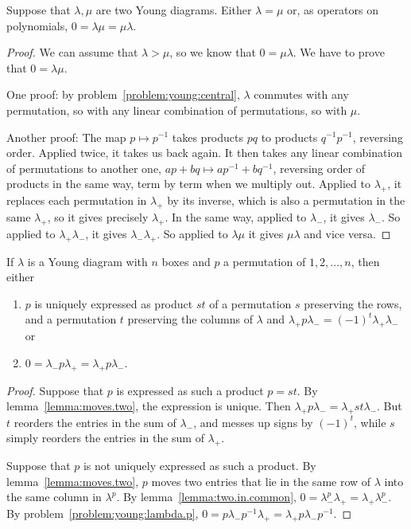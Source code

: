 \begin{theorem}
Suppose that \(\lambda, \mu\) are two Young diagrams.
Either \(\lambda=\mu\) or, as operators on polynomials, \(0=\lambda\mu=\mu\lambda\).
\end{theorem}
\begin{proof}
We can assume that \(\lambda > \mu\), so we know that \(0=\mu\lambda\).
We have to prove that \(0=\lambda\mu\).

One proof: by problem~\vref{problem:young:central}, \(\lambda\) commutes with any permutation, so with any linear combination of permutations, so with \(\mu\).

Another proof:
The map \(p \mapsto p^{-1}\) takes products \(pq\) to products \(q^{-1}p^{-1}\), reversing order.
Applied twice, it takes us back again.
It then takes any linear combination of permutations to another one, \(ap+bq\mapsto ap^{-1}+bq^{-1}\), reversing order of products in the same way, term by term when we multiply out.
Applied to \(\lambda_+\), it replaces each permutation in \(\lambda_+\) by its inverse, which is also a permutation in the same \(\lambda_+\), so it gives precisely \(\lambda_+\).
In the same way, applied to \(\lambda_-\), it gives \(\lambda_-\).
So applied to \(\lambda_+\lambda_-\), it gives \(\lambda_-\lambda_+\).
So applied to \(\lambda\mu\) it gives \(\mu\lambda\) and vice versa.
\end{proof}




\begin{corollary}\label{corollary:young.insertion}
If \(\lambda\) is a Young diagram with \(n\) boxes and \(p\) a permutation of \(1,2,\dots,n\), then either
\begin{enumerate}
\item
\(p\) is uniquely expressed as product \(st\) of a permutation \(s\) preserving the rows, and a permutation \(t\) preserving the columns of \(\lambda\) and \(\lambda_+p\lambda_-=(-1)^t\lambda_+\lambda_-\) or
\item 
\(0=\lambda_-p\lambda_+=\lambda_+p\lambda_-\).
\end{enumerate}
\end{corollary}
\begin{proof}
Suppose that \(p\) is expressed as such a product \(p=st\).
By lemma~\vref{lemma:moves.two}, the expression is unique.
Then \(\lambda_+p\lambda_-=\lambda_+st\lambda_-\).
But \(t\) reorders the entries in the sum of \(\lambda_-\), and messes up signs by \((-1)^t\), while \(s\) simply reorders the entries in the sum of \(\lambda_+\).

Suppose that \(p\) is not uniquely expressed as such a product.
By lemma~\vref{lemma:moves.two}, \(p\) moves two entries that lie in the same row of \(\lambda\) into the same column in \(\lambda^p\).
By lemma~\vref{lemma:two.in.common}, \(0=\lambda^p_-\lambda_+=\lambda_+\lambda^p_-\).
By problem~\vref{problem:young:lambda.p}, \(0=p\lambda_-p^{-1}\lambda_+=\lambda_+p\lambda_-p^{-1}\).
\end{proof}

